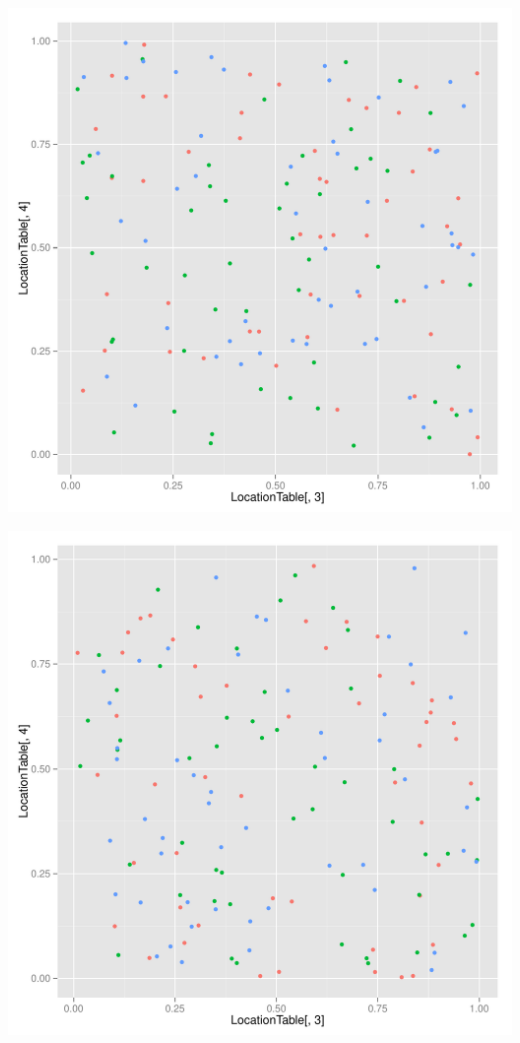 \documentclass{article}\usepackage[]{graphicx}\usepackage[]{color}
\makeatletter
\def\maxwidth{ %
  \ifdim\Gin@nat@width>\linewidth
    \linewidth
  \else
    \Gin@nat@width
  \fi
}
\newenvironment{knitrout}{}{} %
\makeatother
\begin{document}
\begin{knitrout}
\includegraphics[width=\maxwidth]{figure/unnamed-chunk-2-18} 

\includegraphics[width=\maxwidth]{figure/unnamed-chunk-2-19} 


\end{knitrout}
\end{document}
